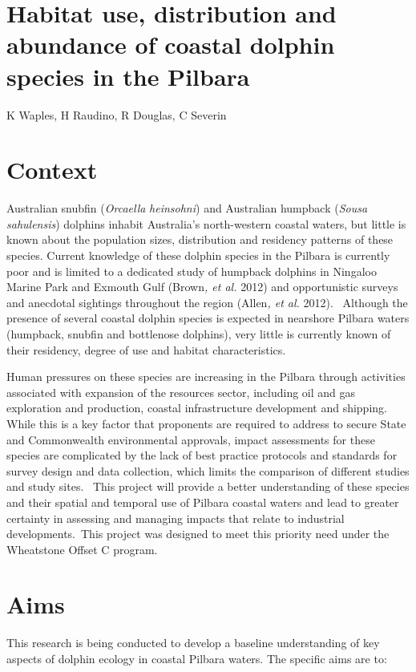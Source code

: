 \documentclass[version=last,
    paper=a4, %
    10pt, %
    usenames,
    dvipsnames,
    oneside, %
    headings=openany, %
    DIV=15 %
]{scrbook}
\begin{document}
\section*{Habitat use, distribution and abundance of coastal dolphin species in
the Pilbara
}

K Waples, H Raudino, R Douglas, C Severin


\section*{Context}
Australian snubfin (\emph{Orcaella} \emph{heinsohni}) and Australian
humpback (\emph{Sousa sahulensis}) dolphins inhabit Australia's
north-western coastal waters, but little is known about the population
sizes, distribution and residency patterns of these species. Current
knowledge of these dolphin species in the Pilbara is currently poor and
is limited to a dedicated study of humpback dolphins in Ningaloo Marine
Park and Exmouth Gulf (Brown\emph{, et al.} 2012) and opportunistic
surveys and anecdotal sightings throughout the region (Allen\emph{, et
al.} 2012). ~Although the presence of several coastal dolphin species is
expected in nearshore Pilbara waters (humpback, snubfin and bottlenose
dolphins), very little is currently known of their residency, degree of
use and habitat characteristics.

Human pressures on these species are increasing in the Pilbara through
activities associated with expansion of the resources sector, including
oil and gas exploration and production, coastal infrastructure
development and shipping. While this is a key factor that proponents are
required to address to secure State and Commonwealth environmental
approvals, impact assessments for these species are complicated by the
lack of best practice protocols and standards for survey design and data
collection, which limits the comparison of different studies and study
sites.~ This project will provide a better understanding of these
species and their spatial and temporal use of Pilbara coastal waters and
lead to greater certainty in assessing and managing impacts that relate
to industrial developments.~This project was designed to meet this
priority need under the Wheatstone Offset C program.~



\section*{Aims}
This research is being conducted to develop a baseline understanding of
key aspects of dolphin ecology in coastal Pilbara waters. The specific
aims are to:
\end{document}
